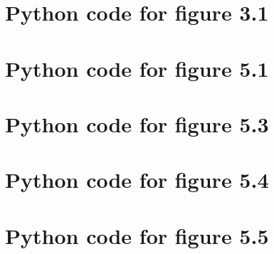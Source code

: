 
\section{Python code for figure 3.1}
{\scriptsize
{}}

\section{Python code for figure 5.1}
{\scriptsize
{}}

\section{Python code for figure 5.3}
\label{code:efficient_decomposable_gaussian}
{\scriptsize
{}}

\section{Python code for figure 5.4}
\label{code:efficient_curlfree_gaussian}
{\scriptsize
{}}

\section{Python code for figure 5.5}
\label{code:efficient_divfree_gaussian}
{\scriptsize
{}}

\chapterend
